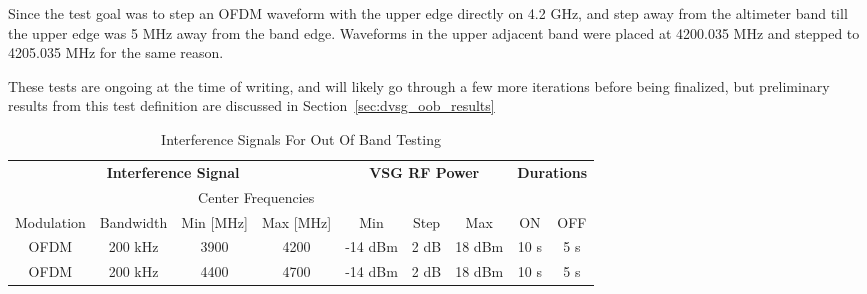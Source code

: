 Since the test goal was to step an OFDM waveform with the upper edge directly on 4.2 GHz, and step away from the altimeter band till the upper edge was 5 MHz away from the band edge. Waveforms in the upper adjacent band were placed at 4200.035 MHz and stepped to 4205.035 MHz for the same reason.

These tests are ongoing at the time of writing, and will likely go through a few more iterations before being finalized, but preliminary results from this test definition are discussed in Section~\ref{sec:dvsg_oob_results}

\begin{table}[]
\begin{tabular}{cc|cc|ccc|cc}
\multicolumn{4}{c|}{\textbf{Interference Signal}}                                     & \multicolumn{3}{c|}{\textbf{VSG RF Power}} & \multicolumn{2}{c}{\textbf{Durations}} \\
                                &           & \multicolumn{2}{c|}{Center Frequencies} &                &            &              &                               &         \\
\multicolumn{1}{c|}{Modulation} & Bandwidth & Min {[}MHz{]}      & Max {[}MHz{]}      & Min            & Step       & Max          & \multicolumn{1}{c|}{ON}       & OFF     \\ \hline
\multicolumn{1}{c|}{OFDM}       & 200 kHz   & 3900           & 4200         & -14 dBm        & 2 dB       & 18 dBm       & \multicolumn{1}{c|}{10 s}     & 5 s    \\
\multicolumn{1}{c|}{OFDM}       & 200 kHz   & 4400      & 4700 & -14 dBm        & 2 dB       & 18 dBm       & \multicolumn{1}{c|}{10 s}     & 5 s   
\end{tabular}
\caption{Interference Signals For Out Of Band Testing}
\label{tab:oob}
\end{table}
